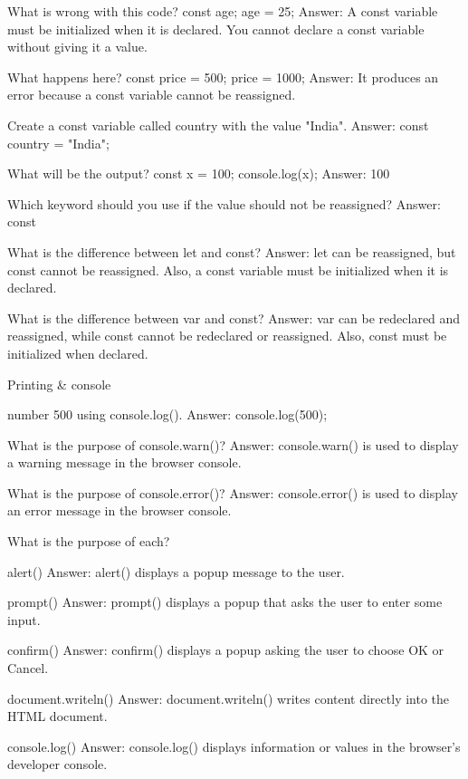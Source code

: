 What is wrong with this code?
const age;
age = 25;
Answer: A const variable must be initialized when it is declared. You cannot declare a const variable without giving it a value.


What happens here?
const price = 500;
price = 1000;
Answer: It produces an error because a const variable cannot be reassigned.

Create a const variable called country with the value "India".
Answer: const country = "India";

What will be the output?
const x = 100;
console.log(x);
Answer: 100

Which keyword should you use if the value should not be reassigned?
Answer: const

What is the difference between let and const?
Answer: let can be reassigned, but const cannot be reassigned. Also, a const variable must be initialized when it is declared.

What is the difference between var and const?
Answer: var can be redeclared and reassigned, while const cannot be redeclared or reassigned. Also, const must be initialized when declared.


Printing & console

number 500 using console.log().
Answer:
console.log(500);

What is the purpose of console.warn()?
Answer: console.warn() is used to display a warning message in the browser console.


What is the purpose of console.error()?
Answer: console.error() is used to display an error message in the browser console.



What is the purpose of each?

alert()
Answer: alert() displays a popup message to the user.

prompt()
Answer: prompt() displays a popup that asks the user to enter some input.

confirm()
Answer: confirm() displays a popup asking the user to choose OK or Cancel.

document.writeln()
Answer: document.writeln() writes content directly into the HTML document.

console.log()
Answer: console.log() displays information or values in the browser's developer console.
